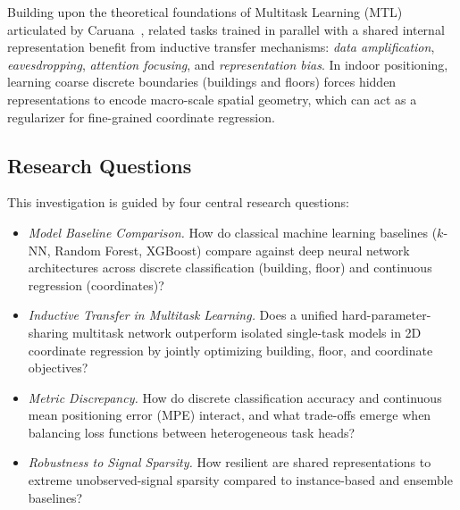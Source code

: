 Building upon the theoretical foundations of Multitask Learning (MTL) articulated by Caruana~\cite{caruana1997multitask}, related tasks trained in parallel with a shared internal representation benefit from inductive transfer mechanisms: \emph{data amplification}, \emph{eavesdropping}, \emph{attention focusing}, and \emph{representation bias}. In indoor positioning, learning coarse discrete boundaries (buildings and floors) forces hidden representations to encode macro-scale spatial geometry, which can act as a regularizer for fine-grained coordinate regression.

\subsection{Research Questions}
This investigation is guided by four central research questions:
\begin{itemize}
    \item[\textbf{RQ1:}] \emph{Model Baseline Comparison.} How do classical machine learning baselines ($k$-NN, Random Forest, XGBoost) compare against deep neural network architectures across discrete classification (building, floor) and continuous regression (coordinates)?
    \item[\textbf{RQ2:}] \emph{Inductive Transfer in Multitask Learning.} Does a unified hard-parameter-sharing multitask network outperform isolated single-task models in 2D coordinate regression by jointly optimizing building, floor, and coordinate objectives?
    \item[\textbf{RQ3:}] \emph{Metric Discrepancy.} How do discrete classification accuracy and continuous mean positioning error (MPE) interact, and what trade-offs emerge when balancing loss functions between heterogeneous task heads?
    \item[\textbf{RQ4:}] \emph{Robustness to Signal Sparsity.} How resilient are shared representations to extreme unobserved-signal sparsity compared to instance-based and ensemble baselines?
\end{itemize}


